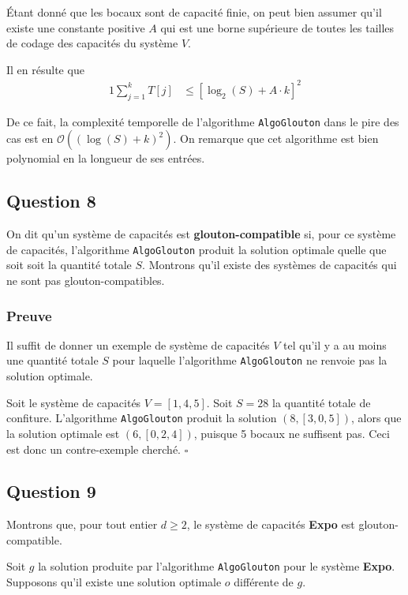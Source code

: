 \documentclass[12pt,a4paper]{article}
\newcommand{\BigO}{\mathcal{O}}
\begin{document}
\'Etant donn\'e que les bocaux sont de capacit\'e finie, on peut bien assumer qu'il existe une constante positive $A$ qui est une borne sup\'erieure de toutes les tailles de codage des capacit\'es du syst\`eme $V$.

Il en r\'esulte que
\begin{alignat*}{1}
 \sum_{j=1}^{k} T[j] &\leq \left[\log_2(S) + A\cdot k\right]^2
\end{alignat*}

De ce fait, la complexit\'e temporelle de l'algorithme \texttt{AlgoGlouton} dans le pire des cas est en $\BigO((\log(S) + k)^2)$. On remarque que cet algorithme est bien polynomial en la longueur de ses entr\'ees.

\subsection*{Question 8}
 On dit qu'un syst\`eme de capacit\'es est {\bfseries glouton-compatible} si, pour ce syst\`eme de capacit\'es, l'algorithme \texttt{AlgoGlouton} produit la solution optimale quelle que soit soit la quantit\'e totale $S$.
 Montrons qu'il existe des syst\`emes de capacit\'es qui ne sont pas glouton-compatibles.
 
 \subsubsection*{Preuve}
 Il suffit de donner un exemple de syst\`eme de capacit\'es $V$ tel qu'il y a au moins une quantit\'e totale $S$ pour laquelle l'algorithme \texttt{AlgoGlouton} ne renvoie pas la solution optimale.
 
 Soit le syst\`eme de capacit\'es $V = [1, 4, 5]$. Soit $S = 28$ la quantit\'e totale de confiture. L'algorithme \texttt{AlgoGlouton} produit la solution $(8, [3, 0, 5])$, alors que la solution optimale est $(6, [0, 2, 4])$, puisque 5 bocaux ne suffisent pas. Ceci est donc un contre-exemple cherch\'e. \hfill\ensuremath{\square}

\subsection*{Question 9}
 Montrons que, pour tout entier $d \geq 2$, le syst\`eme de capacit\'es {\bfseries Expo} est glouton-compatible.
 
 Soit $g$ la solution produite par l'algorithme \texttt{AlgoGlouton} pour le syst\`eme {\bfseries Expo}. Supposons qu'il existe une solution optimale $o$ diff\'erente de $g$.
\end{document}
